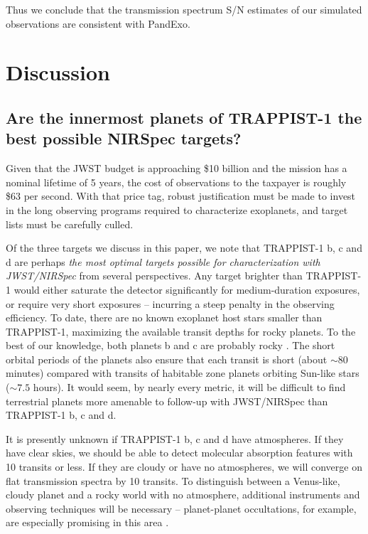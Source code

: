 Thus we conclude that the transmission spectrum S/N estimates of our simulated observations are consistent with PandExo.

\section{Discussion}

\subsection{Are the innermost planets of TRAPPIST-1 the best possible NIRSpec targets?}

Given that the JWST budget is approaching \$10 billion and the mission has a nominal lifetime of 5 years, the cost of observations to the taxpayer is roughly \$63 per second. With that price tag, robust justification must be made to invest in the long observing programs required to characterize exoplanets, and target lists must be carefully culled. 

Of the three targets we discuss in this paper, we note that TRAPPIST-1 b, c and d are perhaps \textit{the most optimal targets possible for characterization with JWST/NIRSpec} from several perspectives. Any target brighter than TRAPPIST-1 would either saturate the detector significantly for medium-duration exposures, or require very short exposures -- incurring a steep penalty in the observing efficiency. To date, there are no known exoplanet host stars smaller than TRAPPIST-1, maximizing the available transit depths for rocky planets. To the best of our knowledge, both planets b and c are probably rocky \citep{Weiss2014,Marcy2014,Rogers2015,Fulton2017}. The short orbital periods of the planets also ensure that each transit is short (about $\sim 80$ minutes) compared with transits of habitable zone planets orbiting Sun-like stars ($\sim 7.5$ hours). It would seem, by nearly every metric, it will be difficult to find terrestrial planets more amenable to follow-up with JWST/NIRSpec than TRAPPIST-1 b, c and d. 

It is presently unknown if TRAPPIST-1 b, c and d have atmospheres. If they have clear skies, we should be able to detect molecular absorption features with 10 transits or less. If they are cloudy or have no atmospheres, we will converge on flat transmission spectra by 10 transits. To distinguish between a Venus-like, cloudy planet and a rocky world with no atmosphere, additional instruments and observing techniques will be necessary -- planet-planet occultations, for example, are especially promising in this area \citep{Luger2017b}. 

